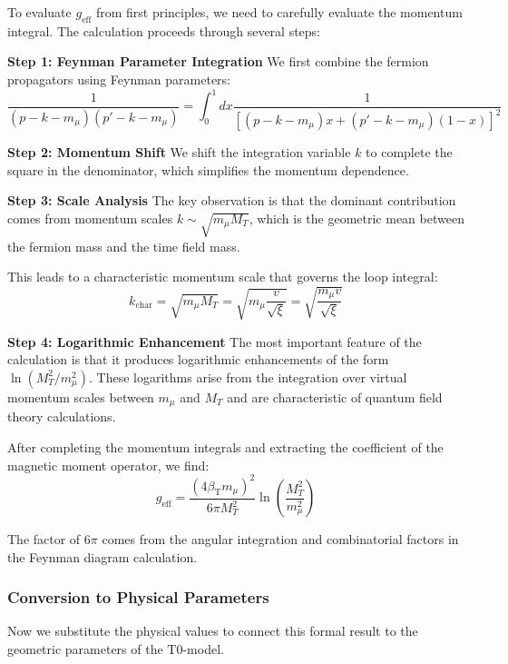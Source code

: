 \documentclass[12pt,a4paper]{article}
\newcommand{\betaT}{\beta_{\text{T}}}
\newcommand{\xipar}{\xi}
\begin{document}
	To evaluate $g_{\text{eff}}$ from first principles, we need to carefully evaluate the momentum integral. The calculation proceeds through several steps:
	
	\textbf{Step 1: Feynman Parameter Integration}
	We first combine the fermion propagators using Feynman parameters:
	\begin{equation}
		\frac{1}{(p-k-m_\mu)(p'-k-m_\mu)} = \int_0^1 dx \frac{1}{[(p-k-m_\mu)x + (p'-k-m_\mu)(1-x)]^2}
	\end{equation}
	
	\textbf{Step 2: Momentum Shift}
	We shift the integration variable $k$ to complete the square in the denominator, which simplifies the momentum dependence.
	
	\textbf{Step 3: Scale Analysis}
	The key observation is that the dominant contribution comes from momentum scales $k \sim \sqrt{m_\mu M_T}$, which is the geometric mean between the fermion mass and the time field mass.
	
	This leads to a characteristic momentum scale that governs the loop integral:
	\begin{equation}
		k_{\text{char}} = \sqrt{m_\mu M_T} = \sqrt{m_\mu \frac{v}{\sqrt{\xipar}}} = \sqrt{\frac{m_\mu v}{\sqrt{\xipar}}}
	\end{equation}
	
	\textbf{Step 4: Logarithmic Enhancement}
	The most important feature of the calculation is that it produces logarithmic enhancements of the form $\ln(M_T^2/m_\mu^2)$. These logarithms arise from the integration over virtual momentum scales between $m_\mu$ and $M_T$ and are characteristic of quantum field theory calculations.
	
	After completing the momentum integrals and extracting the coefficient of the magnetic moment operator, we find:
	\begin{equation}
		g_{\text{eff}} = \frac{(4\betaT m_\mu)^2}{6\pi M_T^2} \ln\left(\frac{M_T^2}{m_\mu^2}\right)
	\end{equation}
	
	The factor of $6\pi$ comes from the angular integration and combinatorial factors in the Feynman diagram calculation.
	
	\subsubsection{Conversion to Physical Parameters}
	
	Now we substitute the physical values to connect this formal result to the geometric parameters of the T0-model.
	
\end{document}
